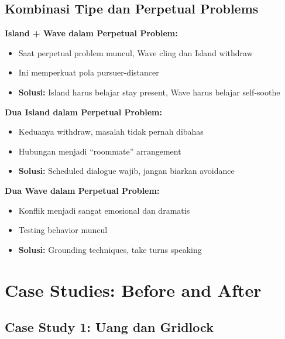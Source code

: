 \subsection{Kombinasi Tipe dan Perpetual Problems}

\begin{warningbox}
\textbf{Island + Wave dalam Perpetual Problem:}
\begin{itemize}
    \item Saat perpetual problem muncul, Wave cling dan Island withdraw
    \item Ini memperkuat pola pursuer-distancer
    \item \textbf{Solusi:} Island harus belajar stay present, Wave harus belajar self-soothe
\end{itemize}

\textbf{Dua Island dalam Perpetual Problem:}
\begin{itemize}
    \item Keduanya withdraw, masalah tidak pernah dibahas
    \item Hubungan menjadi ``roommate'' arrangement
    \item \textbf{Solusi:} Scheduled dialogue wajib, jangan biarkan avoidance
\end{itemize}

\textbf{Dua Wave dalam Perpetual Problem:}
\begin{itemize}
    \item Konflik menjadi sangat emosional dan dramatis
    \item Testing behavior muncul
    \item \textbf{Solusi:} Grounding techniques, take turns speaking
\end{itemize}
\end{warningbox}

\section{Case Studies: Before and After}

\subsection{Case Study 1: Uang dan Gridlock}

